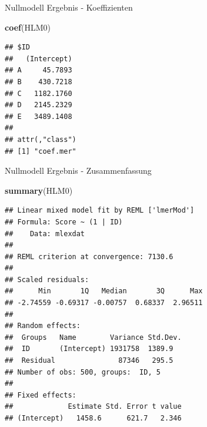\documentclass[ignorenonframetext,]{beamer}
\newenvironment{Shaded}{}{}
\newcommand{\KeywordTok}[1]{\textcolor[rgb]{0.00,0.44,0.13}{\textbf{{#1}}}}
\newcommand{\NormalTok}[1]{{#1}}
\begin{document}
\begin{frame}[fragile]{Nullmodell Ergebnis - Koeffizienten}

\begin{Shaded}
\begin{Highlighting}[]
\KeywordTok{coef}\NormalTok{(HLM0)}
\end{Highlighting}
\end{Shaded}

\begin{verbatim}
## $ID
##   (Intercept)
## A     45.7893
## B    430.7218
## C   1182.1760
## D   2145.2329
## E   3489.1408
## 
## attr(,"class")
## [1] "coef.mer"
\end{verbatim}

\end{frame}

\begin{frame}[fragile]{Nullmodell Ergebnis - Zusammenfassung}

\begin{Shaded}
\begin{Highlighting}[]
\KeywordTok{summary}\NormalTok{(HLM0)}
\end{Highlighting}
\end{Shaded}

\begin{verbatim}
## Linear mixed model fit by REML ['lmerMod']
## Formula: Score ~ (1 | ID)
##    Data: mlexdat
## 
## REML criterion at convergence: 7130.6
## 
## Scaled residuals: 
##      Min       1Q   Median       3Q      Max 
## -2.74559 -0.69317 -0.00757  0.68337  2.96511 
## 
## Random effects:
##  Groups   Name        Variance Std.Dev.
##  ID       (Intercept) 1931758  1389.9  
##  Residual               87346   295.5  
## Number of obs: 500, groups:  ID, 5
## 
## Fixed effects:
##             Estimate Std. Error t value
## (Intercept)   1458.6      621.7   2.346
\end{verbatim}

\end{frame}
\end{document}
